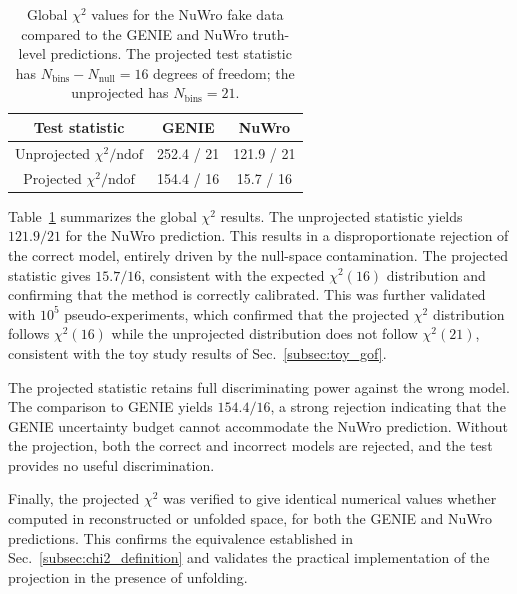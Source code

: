 \documentclass[a4paper,11pt]{article}
\newcommand{\strutlike}{\rule{0pt}{1.1\normalbaselineskip}}
\begin{document}
\begin{table}[!h]
	\caption{Global $\chi^2$ values for the NuWro fake data compared to the GENIE and NuWro truth-level predictions. The projected test statistic has $N_{\text{bins}} - N_{\text{null}} = 16$ degrees of freedom; the unprojected has $N_{\text{bins}} = 21$.}
	\begin{center}
        \begin{small}
			\begin{tabular}{ccc}
                \parbox{6em}{\centering Test statistic}         &  \parbox{4em}{\centering GENIE} & \parbox{4em}{\centering NuWro} \\[1mm] \hline
                \strutlike Unprojected $\chi^{2} / \text{ndof}$ &                      252.4 / 21 &                     121.9 / 21 \\[1mm]
                Projected $\chi^{2} / \text{ndof}$              &                      154.4 / 16 &                      15.7 / 16 \\[1mm]
            \end{tabular} 
        \end{small}
	\end{center}
	\label{tab:real_chi2}
\end{table}

Table~\ref{tab:real_chi2} summarizes the global $\chi^2$ results. The unprojected statistic yields $121.9 / 21$ for the NuWro prediction. This results in a disproportionate rejection of the correct model, entirely driven by the null-space contamination. The projected statistic gives $15.7 / 16$, consistent with the expected $\chi^2(16)$ distribution and confirming that the method is correctly calibrated. This was further validated with $10^5$ pseudo-experiments, which confirmed that the projected $\chi^2$ distribution follows $\chi^2(16)$ while the unprojected distribution does not follow $\chi^2(21)$, consistent with the toy study results of Sec.~\ref{subsec:toy_gof}.

The projected statistic retains full discriminating power against the wrong model. The comparison to GENIE yields $154.4 / 16$, a strong rejection indicating that the GENIE uncertainty budget cannot accommodate the NuWro prediction. Without the projection, both the correct and incorrect models are rejected, and the test provides no useful discrimination.

Finally, the projected $\chi^2$ was verified to give identical numerical values whether computed in reconstructed or unfolded space, for both the GENIE and NuWro predictions. This confirms the equivalence established in Sec.~\ref{subsec:chi2_definition} and validates the practical implementation of the projection in the presence of unfolding.
\end{document}
